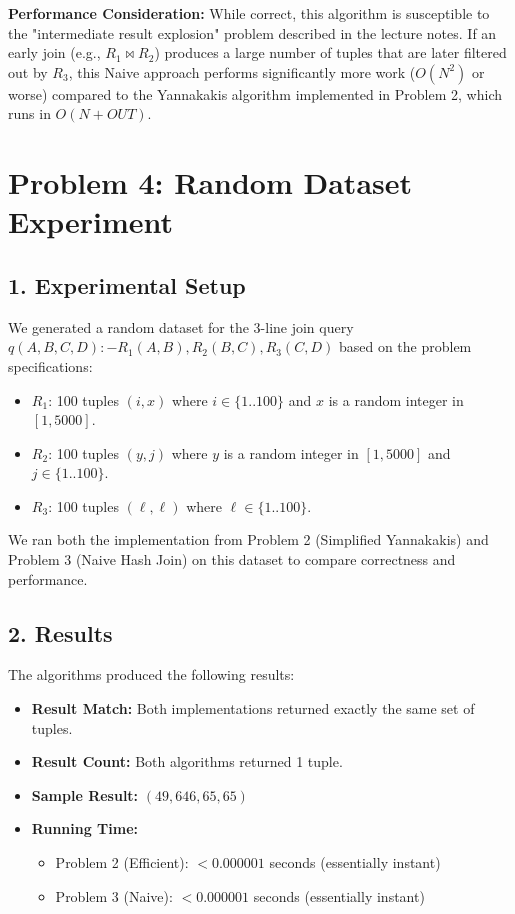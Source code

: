 \documentclass[11pt]{article}
\begin{document}
\textbf{Performance Consideration:}
While correct, this algorithm is susceptible to the "intermediate result explosion" problem described in the lecture notes. If an early join (e.g., $R_1 \bowtie R_2$) produces a large number of tuples that are later filtered out by $R_3$, this Naive approach performs significantly more work ($O(N^2)$ or worse) compared to the Yannakakis algorithm implemented in Problem 2, which runs in $O(N + OUT)$.

\section*{Problem 4: Random Dataset Experiment}

\subsection*{1. Experimental Setup}
We generated a random dataset for the 3-line join query $q(A, B, C, D) :- R_1(A, B), R_2(B, C), R_3(C, D)$ based on the problem specifications:
\begin{itemize}
    \item $R_1$: 100 tuples $(i, x)$ where $i \in \{1..100\}$ and $x$ is a random integer in $[1, 5000]$.
    \item $R_2$: 100 tuples $(y, j)$ where $y$ is a random integer in $[1, 5000]$ and $j \in \{1..100\}$.
    \item $R_3$: 100 tuples $(\ell, \ell)$ where $\ell \in \{1..100\}$.
\end{itemize}

We ran both the implementation from Problem 2 (Simplified Yannakakis) and Problem 3 (Naive Hash Join) on this dataset to compare correctness and performance.

\subsection*{2. Results}
The algorithms produced the following results:

\begin{itemize}
    \item \textbf{Result Match:} Both implementations returned exactly the same set of tuples.
    \item \textbf{Result Count:} Both algorithms returned 1 tuple.
    \item \textbf{Sample Result:} $(49, 646, 65, 65)$
    \item \textbf{Running Time:} 
    \begin{itemize}
        \item Problem 2 (Efficient): $< 0.000001$ seconds (essentially instant)
        \item Problem 3 (Naive): $< 0.000001$ seconds (essentially instant)
    \end{itemize}
\end{itemize}
\end{document}
